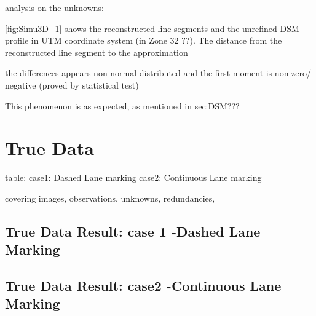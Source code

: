 analysis on the unknowns:

\cref{fig:Simu3D_1} shows the reconstructed line segments and the unrefined DSM profile in UTM coordinate system (in Zone 32 ??). The distance from the reconstructed line segment to the approximation

the differences appears non-normal distributed and the first moment is non-zero/ negative (proved by statistical test)

This phenomenon is as expected, as mentioned in sec:DSM??? 




\clearpage



 





\section{True Data}
\label{sec:truedata}

table:
case1: Dashed Lane marking
case2: Continuous Lane marking%

covering images, observations, unknowns, redundancies, 



\subsection{True Data Result: case 1 -Dashed Lane Marking}
\label{subsec:trueresult-1}


\subsection{True Data Result: case2 -Continuous Lane Marking}
\label{subsec:trueresult-2}


